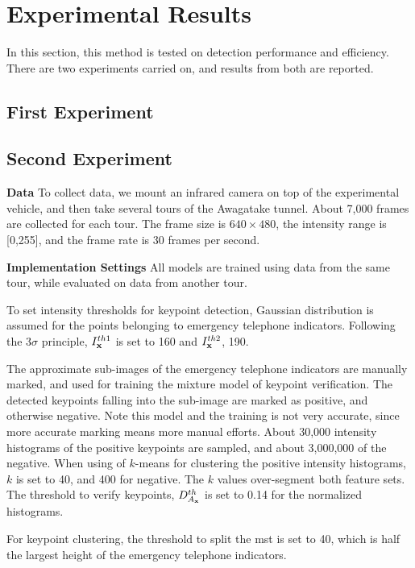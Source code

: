 \section{Experimental Results}
\label{exp}
In this section, this method is tested on detection performance and efficiency. There are two experiments carried on, and results from both are reported.

\subsection{First Experiment}
\subsection{Second Experiment}



\textbf{Data} To collect data, we mount  an infrared camera on top of the experimental vehicle, and then  take several tours of the Awagatake tunnel. About 7,000 frames are collected for each tour. The frame size is $640\times 480$, the intensity range is [0,255], and the frame rate is 30 frames per second.

\textbf{Implementation Settings} All models are trained using data from the same tour, while evaluated on data from another tour.

To set intensity thresholds for keypoint detection, Gaussian distribution is assumed for the points belonging to emergency telephone indicators. Following the $3\sigma$ principle, $I^{th1}_{\bf{x}}$ is set to 160 and $I^{th2}_{\bf{x}}$, 190.

The approximate sub-images of the emergency telephone indicators are manually marked, and used for training the mixture model of keypoint verification. The detected keypoints falling into the sub-image are marked as positive, and otherwise negative. Note this model and the training is not very accurate, since more accurate marking means more manual efforts. About 30,000 intensity histograms of the positive keypoints are sampled, and about 3,000,000 of the negative. When using of $k$-means for clustering the positive intensity histograms, $k$ is set to 40, and 400 for negative. The $k$ values over-segment both feature sets. The threshold to verify keypoints, $D^{th}_{A_{\bf{x}}}$ is set to 0.14 for the normalized histograms.

For keypoint clustering, the threshold to split the mst is set to 40, which is half the largest height of the emergency telephone indicators.

